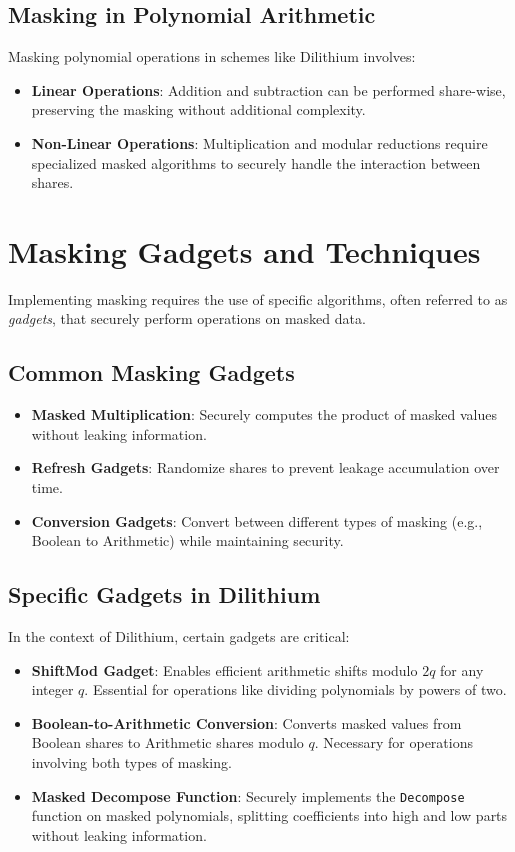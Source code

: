 \subsection{Masking in Polynomial Arithmetic}

Masking polynomial operations in schemes like Dilithium involves:

\begin{itemize}
    \item \textbf{Linear Operations}: Addition and subtraction can be performed share-wise, preserving the masking without additional complexity.
    \item \textbf{Non-Linear Operations}: Multiplication and modular reductions require specialized masked algorithms to securely handle the interaction between shares.
\end{itemize}

\section{Masking Gadgets and Techniques}

Implementing masking requires the use of specific algorithms, often referred to as \emph{gadgets}, that securely perform operations on masked data.

\subsection{Common Masking Gadgets}

\begin{itemize}
    \item \textbf{Masked Multiplication}: Securely computes the product of masked values without leaking information.
    \item \textbf{Refresh Gadgets}: Randomize shares to prevent leakage accumulation over time.
    \item \textbf{Conversion Gadgets}: Convert between different types of masking (e.g., Boolean to Arithmetic) while maintaining security.
\end{itemize}

\subsection{Specific Gadgets in Dilithium}

In the context of Dilithium, certain gadgets are critical:

\begin{itemize}
    \item \textbf{ShiftMod Gadget}: Enables efficient arithmetic shifts modulo $2q$ for any integer $q$. Essential for operations like dividing polynomials by powers of two.
    \item \textbf{Boolean-to-Arithmetic Conversion}: Converts masked values from Boolean shares to Arithmetic shares modulo $q$. Necessary for operations involving both types of masking.
    \item \textbf{Masked Decompose Function}: Securely implements the \texttt{Decompose} function on masked polynomials, splitting coefficients into high and low parts without leaking information.
\end{itemize}

